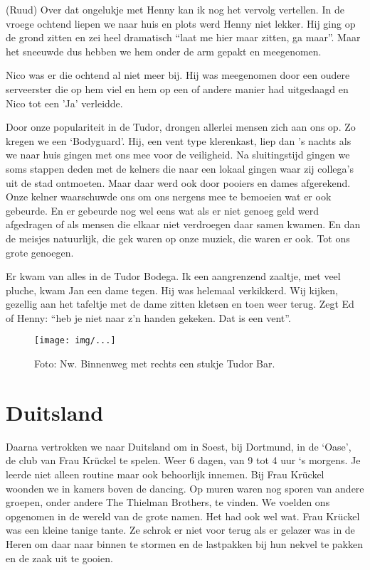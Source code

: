 \documentclass[10pt,twoside,openright]{memoir}
\begin{document}
(Ruud) Over dat ongelukje met Henny kan ik nog het vervolg vertellen. In de vroege ochtend liepen we naar huis en plots werd Henny niet lekker. Hij ging op de grond zitten en zei heel dramatisch “laat me hier maar zitten, ga maar”. Maar het sneeuwde dus hebben we hem onder de arm gepakt en meegenomen. 

Nico was er die ochtend al niet meer bij. Hij was meegenomen door een oudere serveerster die op hem viel en hem op een of andere manier had uitgedaagd en Nico tot een ’Ja’ verleidde.

Door onze populariteit in de Tudor, drongen allerlei mensen zich aan ons op. Zo kregen we een ‘Bodyguard’. Hij, een vent type klerenkast, liep dan ’s nachts als we naar huis gingen met ons mee voor de veiligheid. Na sluitingstijd gingen we soms stappen deden met de kelners die naar een lokaal gingen waar zij collega’s uit de stad ontmoeten. Maar daar werd ook door pooiers en dames afgerekend. Onze kelner waarschuwde ons om ons nergens mee te bemoeien wat er ook gebeurde. En er gebeurde nog wel eens wat als er niet genoeg geld werd afgedragen of als mensen die elkaar niet verdroegen daar samen kwamen. En dan de meisjes natuurlijk, die gek waren op onze muziek, die waren er ook. Tot ons grote genoegen. 

Er kwam van alles in de Tudor Bodega. Ik een aangrenzend zaaltje, met veel pluche, kwam Jan een dame tegen. Hij was helemaal verkikkerd. Wij kijken, gezellig aan het tafeltje met de dame zitten kletsen en toen weer terug. Zegt Ed of Henny: “heb je niet naar z’n handen gekeken. Dat is een vent”. 

\begin{figure}[t]
\texttt{[image: img/...]}
\caption{Foto: Nw. Binnenweg met rechts een stukje Tudor Bar.}
\end{figure}

\chapter{Duitsland} %
\label{cha:duitsland}

Daarna vertrokken we naar Duitsland om in Soest, bij Dortmund, in de ‘Oase’, de club van Frau Krückel te spelen. Weer 6 dagen, van 9 tot 4 uur ‘s morgens. Je leerde niet alleen routine maar ook behoorlijk innemen. Bij Frau Krückel woonden we in kamers boven de dancing. Op muren waren nog sporen van andere groepen, onder andere The Thielman Brothers, te vinden. We voelden ons opgenomen in de wereld van de grote namen. Het had ook wel wat. Frau Krückel was een kleine tanige tante. Ze schrok er niet voor terug als er gelazer was in de Heren om daar naar binnen te stormen en de lastpakken bij hun nekvel te pakken en de zaak uit te gooien.
\end{document}
